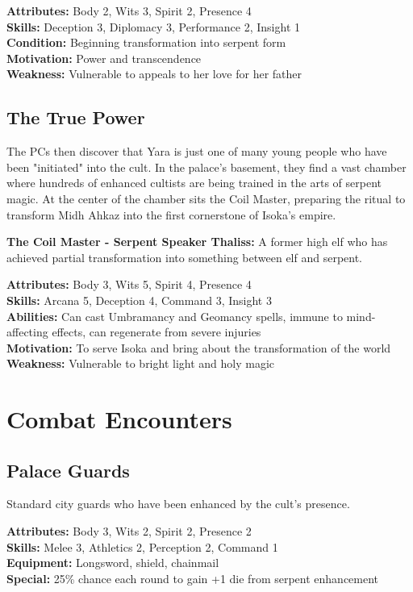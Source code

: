 \documentclass[12pt,twoside]{article}
\begin{document}
\textbf{Attributes:} Body 2, Wits 3, Spirit 2, Presence 4 \\
\textbf{Skills:} Deception 3, Diplomacy 3, Performance 2, Insight 1 \\
\textbf{Condition:} Beginning transformation into serpent form \\
\textbf{Motivation:} Power and transcendence \\
\textbf{Weakness:} Vulnerable to appeals to her love for her father

\subsection{The True Power}

The PCs then discover that Yara is just one of many young people who have been "initiated" into the cult. In the palace's basement, they find a vast chamber where hundreds of enhanced cultists are being trained in the arts of serpent magic. At the center of the chamber sits the Coil Master, preparing the ritual to transform Midh Ahkaz into the first cornerstone of Isoka's empire.

\textbf{The Coil Master - Serpent Speaker Thaliss:}
A former high elf who has achieved partial transformation into something between elf and serpent.

\textbf{Attributes:} Body 3, Wits 5, Spirit 4, Presence 4 \\
\textbf{Skills:} Arcana 5, Deception 4, Command 3, Insight 3 \\
\textbf{Abilities:} Can cast Umbramancy and Geomancy spells, immune to mind-affecting effects, can regenerate from severe injuries \\
\textbf{Motivation:} To serve Isoka and bring about the transformation of the world \\
\textbf{Weakness:} Vulnerable to bright light and holy magic

\section{Combat Encounters}

\subsection{Palace Guards}

Standard city guards who have been enhanced by the cult's presence.

\textbf{Attributes:} Body 3, Wits 2, Spirit 2, Presence 2 \\
\textbf{Skills:} Melee 3, Athletics 2, Perception 2, Command 1 \\
\textbf{Equipment:} Longsword, shield, chainmail \\
\textbf{Special:} 25\% chance each round to gain +1 die from serpent enhancement
\end{document}
